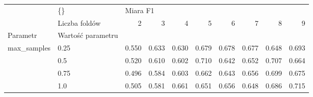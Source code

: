 \begin{tabular}{llrrrrrrrr}
\hline
            & \{\} & \multicolumn{8}{l}{Miara F1} \\
            & Liczba foldów &        2 &      3 &      4 &      5 &      6 &      7 &      8 &      9 \\
Parametr & Wartość parametru &          &        &        &        &        &        &        &        \\
\hline
max\_samples & 0.25 &    0.550 &  0.633 &  0.630 &  0.679 &  0.678 &  0.677 &  0.648 &  0.693 \\
            & 0.5 &    0.520 &  0.610 &  0.602 &  0.710 &  0.642 &  0.652 &  0.707 &  0.664 \\
            & 0.75 &    0.496 &  0.584 &  0.603 &  0.662 &  0.643 &  0.656 &  0.699 &  0.675 \\
            & 1.0 &    0.505 &  0.581 &  0.661 &  0.651 &  0.656 &  0.648 &  0.686 &  0.715 \\
\hline
\end{tabular}
